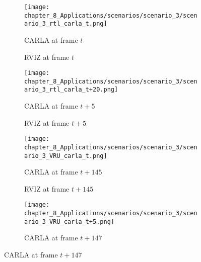 \begin{figure}[]
	\begin{subfigure}{0.42\textwidth}
		\texttt{[image: chapter\_8\_Applications/scenarios/scenario\_3/scenario\_3\_rtl\_carla\_t.png]}
		\caption{\ac{CARLA} at frame $t$}
		\label{subfig:chapter_8_Applications/scenarios/scenario_3/scenario_3_rtl_carla_t}
	\end{subfigure}
	\begin{subfigure}{0.42\textwidth}
		\caption{\ac{RVIZ} at frame $t$}
		\label{subfig:chapter_8_Applications/scenarios/scenario_3/scenario_3_rtl_rviz_t}
	\end{subfigure}
	\tabularnewline
	\begin{subfigure}{0.42\textwidth}
		\texttt{[image: chapter\_8\_Applications/scenarios/scenario\_3/scenario\_3\_rtl\_carla\_t+20.png]}
		\caption{\ac{CARLA} at frame $t+5$}
		\label{subfig:chapter_8_Applications/scenarios/scenario_3/scenario_3_rtl_carla_t+20}
	\end{subfigure}
	\begin{subfigure}{0.42\textwidth}
		\caption{\ac{RVIZ} at frame $t+5$}
		\label{subfig:chapter_8_Applications/scenarios/scenario_3/scenario_3_rtl_rviz_t+20}
	\end{subfigure}
	\tabularnewline
	\begin{subfigure}{0.42\textwidth}
		\texttt{[image: chapter\_8\_Applications/scenarios/scenario\_3/scenario\_3\_VRU\_carla\_t.png]}
		\caption{\ac{CARLA} at frame $t+145$}
		\label{subfig:chapter_8_Applications/scenarios/scenario_3/scenario_3_VRU_carla_t}
	\end{subfigure}
	\begin{subfigure}{0.42\textwidth}
		\caption{\ac{RVIZ} at frame $t+145$}
		\label{subfig:chapter_8_Applications/scenarios/scenario_3/scenario_3_VRU_rviz_t}
	\end{subfigure}
	\tabularnewline
	\begin{subfigure}{0.42\textwidth}
		\texttt{[image: chapter\_8\_Applications/scenarios/scenario\_3/scenario\_3\_VRU\_carla\_t+5.png]}
		\caption{\ac{CARLA} at frame $t+147$}

\end{subfigure}
\end{figure}
